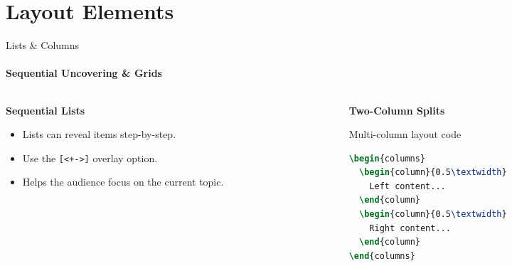 
\section{Layout Elements}

\begin{frame}[fragile]{Lists \& Columns}
\framesubtitle{Sequential Uncovering \& Grids}
\begin{columns}[T]
    \begin{column}{0.48\textwidth}
        \textbf{Sequential Lists}
        \begin{itemize}[<+->]
            \item Lists can reveal items step-by-step.
            \item Use the \verb|[<+->]| overlay option.
            \item Helps the audience focus on the current topic.
        \end{itemize}
    \end{column}
    \begin{column}{0.48\textwidth}
        \textbf{Two-Column Splits}
        \begin{block}{Multi-column layout code}
\begin{lstlisting}[language=TeX]
\begin{columns}
  \begin{column}{0.5\textwidth}
    Left content...
  \end{column}
  \begin{column}{0.5\textwidth}
    Right content...
  \end{column}
\end{columns}
\end{lstlisting}
        \end{block}
    \end{column}
\end{columns}
\end{frame}

